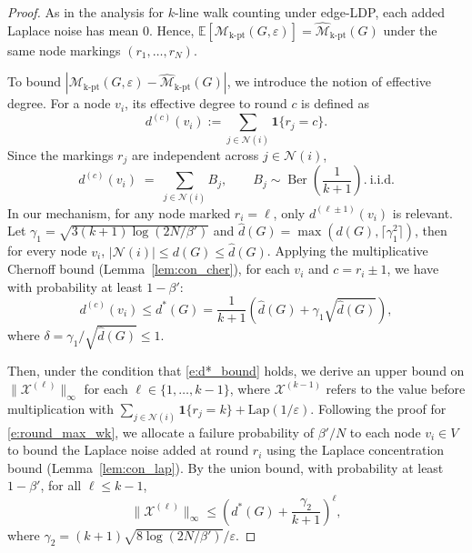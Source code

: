 \begin{proof}

As in the analysis for $k$-line walk counting under edge-LDP, each added Laplace noise has mean $0$.
Hence, $\mathbb{E}[\mathcal{M}_{\mathrm{k\text{-}pt}}(G, \varepsilon)] = \widehat{\mathcal{M}}_{\mathrm{k\text{-}pt}}(G)$ under the same node markings $(r_1,\dots,r_N)$.


To bound $|\mathcal{M}_{\mathrm{k\text{-}pt}}(G, \varepsilon) - 
    \widehat{\mathcal{M}}_{\mathrm{k\text{-}pt}}(G)|$, we introduce the notion of effective degree.
For a node $v_i$, its effective degree to round $c$ is defined as
\begin{equation}
    \label{e:eff_deg}
     d^{(c)}(v_i) := 
   \sum_{j\in \mathcal{N}(i)} \mathbf{1}\{r_j = c\}.
\end{equation} 
Since the markings $r_j$ are independent across $j \in \mathcal{N}(i)$,
\begin{equation*}
    d^{(c)}(v_i)  \;=\; \sum_{j\in \mathcal{N}(i)} B_j,
\qquad
B_j \sim \operatorname{Ber}(\frac{1}{k + 1}).\ \text{i.i.d.}
\end{equation*}
In our mechanism, for any node marked $r_i = \ell$, only $d^{(\ell\pm1)}(v_i)$ is relevant. 
Let $\gamma_1 = \sqrt{3(k + 1)\log(2N / \beta')}$ and $\hat{d}(G) = \max(d(G), \lceil \gamma_1^2 \rceil)$, then for every node $v_i$, $|\mathcal{N}(i)| \leq d(G) \leq \hat{d}(G)$.
Applying the multiplicative Chernoff bound (Lemma~\ref{lem:con_cher}), for each $v_i$ and $c = r_i \pm 1$, we have with probability at least $1 - \beta'$:
\begin{equation}
\label{e:d*_bound}
    d^{(c)}(v_i) \leq d^*(G) 
    = \frac{1}{k + 1} \left( \hat{d}(G) + \gamma_1 \sqrt{\hat{d}(G)} \right),
\end{equation}
where $\delta = \gamma_1 / \sqrt{\hat{d}(G)} \leq 1$.





Then, under the condition that \eqref{e:d*_bound} holds, we derive an upper bound on $\|\mathcal{X}^{(\ell)}\|_\infty$ for each $\ell \in \{1, \dots, k-1\}$, where $\mathcal{X}^{(k-1)}$ refers to the value before multiplication with $\sum_{j \in \mathcal{N}(i)} \mathbf{1}\{r_j = k\} + \mathrm{Lap}(1/\varepsilon)$.
Following the proof for \eqref{e:round_max_wk},
we allocate a failure probability of $\beta'/N$ to each node $v_i \in V$ to bound the Laplace noise added at round $r_i$ using the Laplace concentration bound (Lemma~\ref{lem:con_lap}). 
By the union bound, with probability at least $1 - \beta'$, for all $\ell \leq k-1$,
\begin{equation}
\label{e:max_sampling_mi}
    \|\mathcal{X}^{(\ell)}\|_\infty 
    \leq (d^*(G) + \frac{\gamma_2}{k+1})^{\ell}
     ,
\end{equation}
where $\gamma_2 = (k{+}1)\sqrt{8\log(2N/\beta')}/\varepsilon$.




\end{proof}
